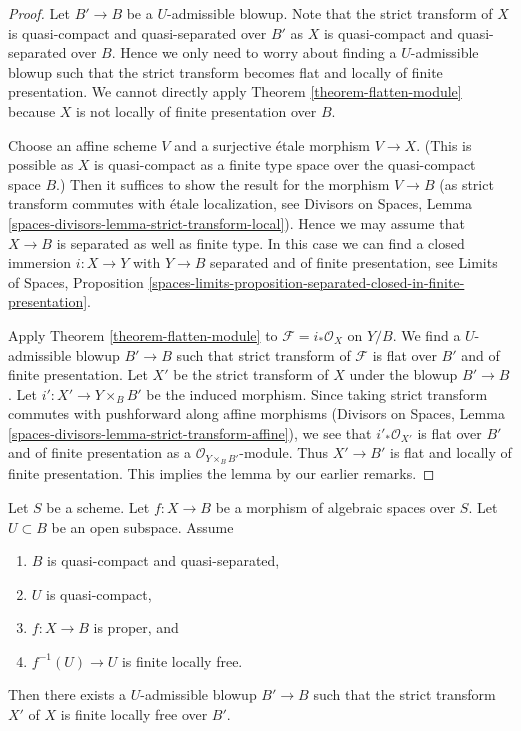 \begin{proof}
Let $B' \to B$ be a $U$-admissible blowup. Note that the strict transform
of $X$ is quasi-compact and quasi-separated over $B'$ as $X$ is quasi-compact
and quasi-separated over $B$. Hence we only need to worry about finding
a $U$-admissible blowup such that the strict transform becomes flat and
locally of finite presentation. We cannot directly apply
Theorem \ref{theorem-flatten-module} because $X$ is not locally of finite
presentation over $B$.

\medskip\noindent
Choose an affine scheme $V$ and a surjective \'etale morphism $V \to X$.
(This is possible as $X$ is quasi-compact as a finite type space over
the quasi-compact space $B$.) Then it suffices to show the result for
the morphism $V \to B$ (as strict transform commutes with \'etale
localization, see Divisors on Spaces,
Lemma \ref{spaces-divisors-lemma-strict-transform-local}).
Hence we may assume that $X \to B$ is separated as well as finite type.
In this case we can find a closed immersion $i : X \to Y$ with $Y \to B$
separated and of finite presentation, see
Limits of Spaces, Proposition
\ref{spaces-limits-proposition-separated-closed-in-finite-presentation}.

\medskip\noindent
Apply Theorem \ref{theorem-flatten-module} to $\mathcal{F} = i_*\mathcal{O}_X$
on $Y/B$. We find a $U$-admissible blowup $B' \to B$ such that strict
transform of $\mathcal{F}$ is flat over $B'$ and of finite presentation.
Let $X'$ be the strict transform of $X$ under the blowup $B' \to B$.
Let $i' : X' \to Y \times_B B'$ be the induced morphism.
Since taking strict transform commutes with pushforward along affine
morphisms (Divisors on Spaces, Lemma
\ref{spaces-divisors-lemma-strict-transform-affine}),
we see that $i'_*\mathcal{O}_{X'}$ is flat over $B'$ and of
finite presentation as a $\mathcal{O}_{Y \times_B B'}$-module.
Thus $X' \to B'$ is flat and locally of finite presentation.
This implies the lemma by our earlier remarks.
\end{proof}

\begin{lemma}
\label{lemma-finite-after-blowing-up}
Let $S$ be a scheme. Let $f : X \to B$ be a morphism of algebraic
spaces over $S$. Let $U \subset B$ be an open subspace. Assume
\begin{enumerate}
\item $B$ is quasi-compact and quasi-separated,
\item $U$ is quasi-compact,
\item $f : X \to B$ is proper, and
\item $f^{-1}(U) \to U$ is finite locally free.
\end{enumerate}
Then there exists a $U$-admissible blowup $B' \to B$ such that
the strict transform $X'$ of $X$ is finite locally free over $B'$.
\end{lemma}

